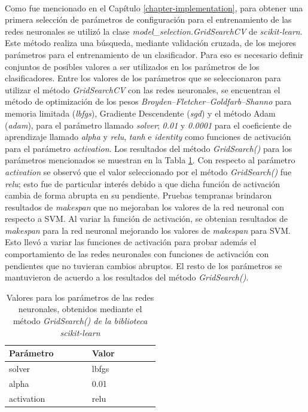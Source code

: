 \paragraph{} Como fue mencionado en el Capítulo \ref{chapter-implementation}, para obtener una primera selección de parámetros de configuración para el entrenamiento de las redes neuronales se utilizó la clase \textit{model\_selection.GridSearchCV} de \textit{scikit-learn}.
Este método realiza una búsqueda, mediante validación cruzada, de los mejores parámetros para el entrenamiento de un clasificador.
Para eso es necesario definir conjuntos de posibles valores a ser utilizados en los parámetros de los clasificadores.
Entre los valores de los parámetros que se seleccionaron para utilizar el método \textit{GridSearchCV} con las redes neuronales, se encuentran el método de optimización de los pesos \textit{Broyden–Fletcher–Goldfarb–Shanno} para memoria limitada (\textit{lbfgs}), Gradiente Descendente (\textit{sgd}) y el método Adam (\textit{adam}), para el parámetro llamado \textit{solver}; \textit{0.01} y \textit{0.0001} para el coeficiente de aprendizaje llamado \textit{alpha} y \textit{relu}, \textit{tanh} e \textit{identity} como funciones de activación para el parámetro \textit{activation}.
Los resultados del método \textit{GridSearch()} para los parámetros mencionados se muestran en la Tabla \ref{table:parametros}.
Con respecto al parámetro \textit{activation} se observó que el valor seleccionado por el método \textit{GridSearch()} fue \textit{relu}; esto fue de particular interés debido a que dicha función de activación cambia de forma abrupta en su pendiente. Pruebas tempranas brindaron resultados de \textit{makespan} que no mejoraban los valores de la red neuronal con respecto a SVM. Al variar la función de activación, se obtenian resultados de \textit{makespan} para la red neuronal mejorando los valores de \textit{makespan} para SVM.
Esto llevó a variar las funciones de activación para probar además el comportamiento de las redes neuronales con funciones de activación con pendientes que no tuvieran cambios abruptos.
El resto de los parámetros se mantuvieron de acuerdo a los resultados del método \textit{GridSearch()}.

\begin{table}[h!]
\centering
\begin{tabular}{ |p{0.25\linewidth}|p{0.25\linewidth}| } 
\hline
\textbf{Parámetro} & \textbf{Valor}\\
\hline
solver & lbfgs\\ 
\hline
alpha & 0.01\\ 
\hline
activation & relu\\ 
\hline
\end{tabular}
\caption{ Valores para los parámetros de las redes neuronales, obtenidos mediante el método \textit{GridSearch() de la biblioteca \textit{scikit-learn}}}
\label{table:parametros}
\end{table}

